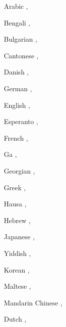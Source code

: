 \begin{itemize}
%
\item Arabic \citep*{HBZ2010a-u,Hahn2011a-u,MIRA2012a-u,BH2014a-u,LBL2015a-u,AHMW2015a-u},
\item Bengali \citep*{Paul2004a-u,IHR2012a-u},
\item Bulgarian \citep*{SOSK2004a-u,Osenova2010a-u,Osenova2010b-u,Osenova2011a-u},
\item Cantonese \citep*{FSB2015a-u},
\item Danish \citep{Oersnes95a,Oersnes2009a,NP2004a,MuellerPredication,MOe2011a,MuellerCopula,MOeDanish},
\item German
\citep{%
Kiss91a,%
Netter93a-u,Netter96a,%
Meurers94,%
HMRSW97a-ed,Kordoni99a-ed,Tseng2000a-ed,%
GK94-u,%
Keller95,%
Babel,Mueller99a,%
MK2000a,Crysmann2003b,Crysmann2005a-u,Crysmann2005c,%
MuellerLehrbuch1,%
KP2007a,KP2008a-u,Kaufmann2009a-u,Fokkens2011a}, 
\item English \citep*{CF2000a-u,FCS2000a,Flickinger2000a,Dahlloef2002a-u,Dahlloef2003a-u,dKM2003b,MdKM2003a,DKMM2004a-u}, 
\item Esperanto \citep{Li96a-u},
\item French \citep*{Tseng2003b-u},
\item Ga \citep*{KDHB2007a,Hellan2007a-u},
\item Georgian \citep{Abzianidze2011a-u},
\item Greek \citep{KN2005a-u},
{\sloppy
\item Hausa \citep{Crysmann2005b-u,Crysmann2009a-u,Crysmann2011a-u,Crysmann2012a-u},
\item Hebrew \citep*{MelnikHandWritten,HMW2013a-u,AHMW2015a-u}, 
\item Japanese \citep{Siegel2000a,SB2002a,BS2005a}, 
}
\item Yiddish \citep{MOe2011a},
\item Korean \citep*{KY2003a-u,KY2004a-u,KY2006a,KY2009a-u,KSY2007a-u,SKBY2010a-u,KYSB2011a-u},
\item Maltese \citep{MuellerMalteseSketch},
\item Mandarin Chinese 
\citep*{Liu97a,%
Ng97a,%
ML2009a,ML2013a,FSB2015a-u},
\item Dutch \citep*{NB94,BvNM2001a-u,Fokkens2011a},

\end{itemize}
